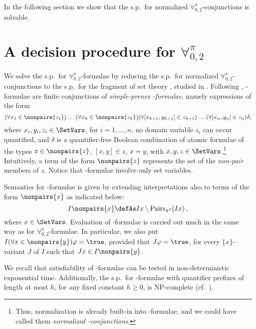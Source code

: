 \documentclass[submission,copyright,creativecommons]{eptcs}
\newcommand{\Lang}{\ensuremath{\mathbf{\forall}^{\pi}_{0,2}}\xspace}
\newcommand{\inter}{I}
\newcommand{\interp}{J}
\newcommand{\pairs}[2]{\mathrm{Pairs}_{\pi^{#1}}(#2)}
\newcommand{\svx}{x}
\begin{document}
In the following section we show that the s.p.\ for normalized
\Lang-conjunctions is solvable. 

\section{A decision procedure for \Lang}\label{DECPROC}

We solve the s.p.\ for \Lang-formulae by reducing the s.p.\ for
normalized \Lang-conjunctions to the s.p.\ for the fragment of set
theory \Forallpizero, studied in \cite{CanLonNic2011}.
Following \cite{CanLonNic2011},
\Forallpizero-formulae are finite conjunctions of \emph{simple-prenex
\Forallpizero-formulae}, namely expressions of the form
\[
 (\forall x_1 \in \nonpairs{z_1})\ldots(\forall x_h \in \nonpairs{z_h})(\forall [x_{h+1}, y_{h+1}] \in z_{h+1})\ldots(\forall [x_n, y_n] \in z_n)\delta,
\]
where $x_i, y_i, z_i \in \SetVars$, for $i = 1,\ldots,n$, no domain
variable $z_{i}$ can occur quantified, and $\delta$ is a
quantifier-free Boolean combination of atomic formulae of the types
$x \in \nonpairs{z}$, $[x,y] \in z$, $x=y$, 
with $x,y,z \in \SetVars$.\footnote{Thus, normalization is already
built-in into \Forallpizero-formulae, and we could have called them
\emph{normalized \Forallpizero-conjunctions}.}
Intuitively, a term of the form $\nonpairs{z}$ represents the set of 
the \emph{non-pair} members of $z$.
Notice that \Forallpizero-formulae involve only set variables.

Semantics for \Forallpizero-formulae is given by extending
interpretations also to terms of the form $\nonpairs{x}$ as indicated
below:
\[
  \inter \nonpairs{\svx} \defAs \inter \svx \setminus \pairs{\inter}{\inter
  \svx} \,,
\]
where $\svx \in \SetVars$.
Evaluation of \Forallpizero-formulae is carried out much in the same
way as for \Lang-formulae.  In particular, we also put
$\inter (\forall x \in \nonpairs{y})\varphi = \true$, provided
  that $\interp \varphi = \true$, for every $\{x\}$-variant $\interp$
  of $\inter$ such that $\interp x \in \inter \nonpairs{y}$. 

We recall that satisfiability of \Forallpizero-formulae can be tested
in non-deterministic exponential time.  Additionally, the s.p.\ for
\Forallpizero-formulae with quantifier prefixes of length at most $h$,
for any fixed constant $h \geq 0$, is \textsc{NP}-complete (cf.\
\cite{CanLonNic2011}).
\end{document}
